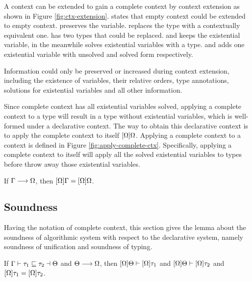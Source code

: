 A context can be extended to gain a complete context by context extension as shown in Figure \ref{fig:ctx-extension}.  states that empty context could be extended to empty context.  preserves the variable.  replaces the type with a contextually equivalent one.  has two types that could be replaced.  and  keeps the existential variable, in the meanwhile  solves existential variables with a type.  and  adds one existential variable with unsolved and solved form respectively.

Information could only be preserved or increased during context extension, including the existence of variables, their relative orders, type annotations, solutions for existential variables and all other information.

Since complete context has all existential variables solved, applying a complete context to a type will result in a type without existential variables, which is well-formed under a declarative context. The way to obtain this declarative context is to apply the complete context to itself $[\Omega]\Omega$. Applying a complete context to a context is defined in Figure \ref{fig:apply-complete-ctx}. Specifically, applying a complete context to itself will apply all the solved existential variables to types before throw away those existential variables.

\begin{lemma}
  \label{lemma:stability-of-complete-context}

  If $\Gamma \longrightarrow \Omega$, then $[\Omega]\Gamma = [\Omega]\Omega$.
\end{lemma}

\subsection{Soundness}

Having the notation of complete context, this section gives the lemma about the soundness of algorithmic system with respect to the declarative system, namely soundness of unification and soundness of typing.

\begin{theorem}

If $\Gamma \vdash \tau_1 \sqsubseteq \tau_2 \dashv \Theta$ and $\Theta \longrightarrow \Omega$, then $[\Omega]\Theta \vdash [\Omega]\tau_1$ and $[\Omega]\Theta \vdash [\Omega]\tau_2$ and $[\Omega]\tau_1 = [\Omega]\tau_2$.
\end{theorem}

